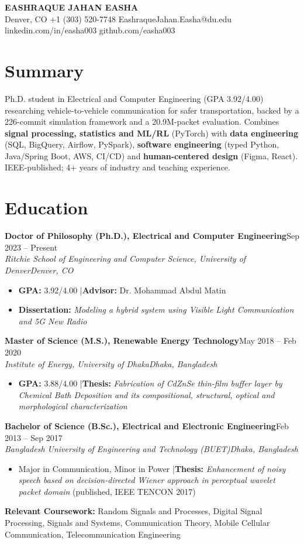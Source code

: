 \documentclass[10pt,letterpaper]{article}
\newcommand{\entry}[4]{\textbf{#1}\hfill #2\\\textit{#3}\hfill\textit{#4}\par}
\begin{document}
\begin{center}{\LARGE\bfseries\color{accent} EASHRAQUE JAHAN EASHA}\\[3pt]
Denver, CO \textbar{} +1 (303) 520-7748 \textbar{} EashraqueJahan.Easha@du.edu \textbar{} linkedin.com/in/easha003 \textbar{} github.com/easha003\end{center}\vspace{-6pt}
\section*{Summary}
Ph.D. student in Electrical and Computer Engineering (GPA 3.92/4.00) researching vehicle-to-vehicle communication for safer transportation, backed by a 226-commit simulation framework and a 20.9M-packet evaluation. Combines \textbf{signal processing, statistics and ML/RL} (PyTorch) with \textbf{data engineering} (SQL, BigQuery, Airflow, PySpark), \textbf{software engineering} (typed Python, Java/Spring Boot, AWS, CI/CD) and \textbf{human-centered design} (Figma, React). IEEE-published; 4+ years of industry and teaching experience.
\section*{Education}
\entry{Doctor of Philosophy (Ph.D.), Electrical and Computer Engineering}{Sep 2023 – Present}{Ritchie School of Engineering and Computer Science, University of Denver}{Denver, CO}
\begin{itemize}\item \textbf{GPA:} 3.92/4.00 \quad|\quad \textbf{Advisor:} Dr. Mohammad Abdul Matin\item \textbf{Dissertation:} \textit{Modeling a hybrid system using Visible Light Communication and 5G New Radio}\end{itemize}
\vspace{2pt}
\entry{Master of Science (M.S.), Renewable Energy Technology}{May 2018 – Feb 2020}{Institute of Energy, University of Dhaka}{Dhaka, Bangladesh}
\begin{itemize}\item \textbf{GPA:} 3.88/4.00 \quad|\quad \textbf{Thesis:} \textit{Fabrication of CdZnSe thin-film buffer layer by Chemical Bath Deposition and its compositional, structural, optical and morphological characterization}\end{itemize}
\vspace{2pt}
\entry{Bachelor of Science (B.Sc.), Electrical and Electronic Engineering}{Feb 2013 – Sep 2017}{Bangladesh University of Engineering and Technology (BUET)}{Dhaka, Bangladesh}
\begin{itemize}\item Major in Communication, Minor in Power \quad|\quad \textbf{Thesis:} \textit{Enhancement of noisy speech based on decision-directed Wiener approach in perceptual wavelet packet domain} (published, IEEE TENCON 2017)\end{itemize}
\vspace{2pt}
\textbf{Relevant Coursework:} Random Signals and Processes, Digital Signal Processing, Signals and Systems, Communication Theory, Mobile Cellular Communication, Telecommunication Engineering
\end{document}
